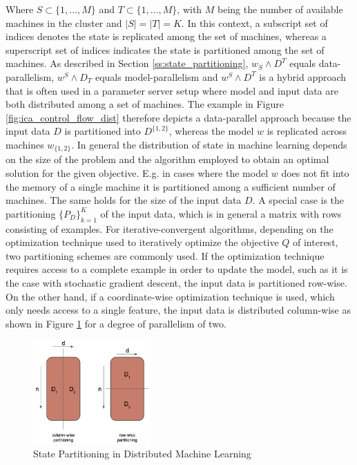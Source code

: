 Where $S \subset \{1, \ldots, M\}$ and $T \subset \{1, \ldots, M\}$, with $M$ being the number of available machines in the cluster and $\mid S \mid = \mid T \mid = K$.
In this context, a subscript set of indices denotes the state is replicated among the set of machines, whereas a superscript set of indices indicates the state is partitioned among the set of machines.
As described in Section \ref{ss:state_partitioning}, $w_S \wedge D^T$ equals data-parallelism, $w^S \wedge D_T$ equals model-parallelism and $w^S \wedge D^T$ is a hybrid approach that is often used in a parameter server setup where model and input data are both distributed among a set of machines.
The example in Figure \ref{fig:ica_control_flow_dist} therefore depicts a data-parallel approach because the input data $D$ is partitioned into $D^{\{1,2\}}$, whereas the model $w$ is replicated across machines $w_{\{1,2\}}$.
In general the distribution of state in machine learning depends on the size of the problem and the algorithm employed to obtain an optimal solution for the given objective.
E.g. in cases where the model $w$ does not fit into the memory of a single machine it is partitioned among a sufficient number of machines.
The same holds for the size of the input data $D$.
A special case is the partitioning $\{P_D\}_{k=1}^K$ of the input data, which is in general a matrix with rows consisting of examples.
For iterative-convergent algorithms, depending on the optimization technique used to iteratively optimize the objective $Q$ of interest, two partitioning schemes are commonly used.
If the optimization technique requires access to a complete example in order to update the model, such as it is the case with stochastic gradient descent, the input data is partitioned row-wise.
On the other hand, if a coordinate-wise optimization technique is used, which only needs access to a single feature, the input data is distributed column-wise as shown in Figure \ref{fig:row_col_dist} for a degree of parallelism of two.
\begin{figure}[ht]
\centering
\includegraphics[width=0.4\textwidth]{img/row_col_dist.png}
\caption{State Partitioning in Distributed Machine Learning}
\label{fig:row_col_dist}
\end{figure}

